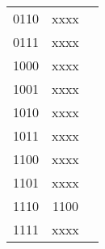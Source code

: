 \begin{table}
\begin{minipage}{0.35\textwidth}
\begin{tabular}{CCR}
0110&xxxx&\\
0111&xxxx&\\
1000&xxxx&\\
1001&xxxx&\\
1010&xxxx&\\
1011&xxxx&\\
1100&xxxx&\\
1101&xxxx&\\
1110&1100&\\
1111&xxxx&\\
\bottomrule
\end{tabular}
\end{minipage}
\end{table}

